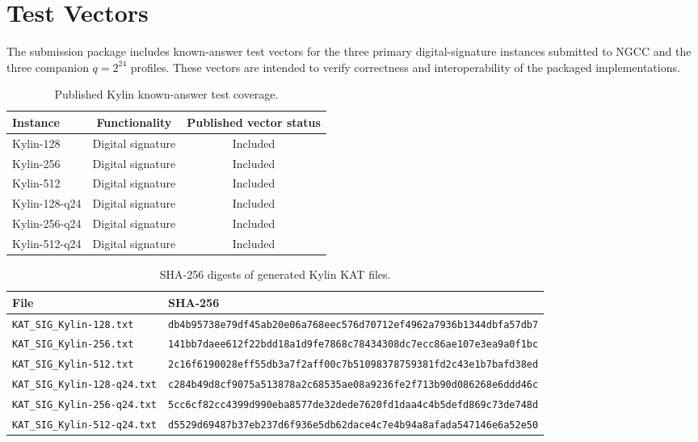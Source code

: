 \section{Test Vectors}
\label{sec:test-vectors}

The submission package includes known-answer test vectors for the three primary
digital-signature instances submitted to NGCC and the three companion
$q=2^{24}$ profiles.  These vectors are intended to verify correctness and
interoperability of the packaged implementations.

\begin{table}[htbp]
    \centering
    \caption{Published Kylin known-answer test coverage.}
    \label{tab:kat-coverage}
    \begin{tabular}{l c c}
    \toprule
    Instance & Functionality & Published vector status \\ \midrule
    Kylin-128 & Digital signature & Included \\
    Kylin-256 & Digital signature & Included \\
    Kylin-512 & Digital signature & Included \\
    Kylin-128-q24 & Digital signature & Included \\
    Kylin-256-q24 & Digital signature & Included \\
    Kylin-512-q24 & Digital signature & Included \\
    \bottomrule
    \end{tabular}
\end{table}

\begin{table}[htbp]
    \centering
    \caption{SHA-256 digests of generated Kylin KAT files.}
    \label{tab:kat-sha256}
    \scriptsize
    \begin{tabular}{l l}
    \toprule
    File & SHA-256 \\ \midrule
    \texttt{KAT\_SIG\_Kylin-128.txt} & \texttt{db4b95738e79df45ab20e06a768eec576d70712ef4962a7936b1344dbfa57db7} \\
    \texttt{KAT\_SIG\_Kylin-256.txt} & \texttt{141bb7daee612f22bdd18a1d9fe7868c78434308dc7ecc86ae107e3ea9a0f1bc} \\
    \texttt{KAT\_SIG\_Kylin-512.txt} & \texttt{2c16f6190028eff55db3a7f2aff00c7b51098378759381fd2c43e1b7bafd38ed} \\
    \texttt{KAT\_SIG\_Kylin-128-q24.txt} & \texttt{c284b49d8cf9075a513878a2c68535ae08a9236fe2f713b90d086268e6ddd46c} \\
    \texttt{KAT\_SIG\_Kylin-256-q24.txt} & \texttt{5cc6cf82cc4399d990eba8577de32dede7620fd1daa4c4b5defd869c73de748d} \\
    \texttt{KAT\_SIG\_Kylin-512-q24.txt} & \texttt{d5529d69487b37eb237d6f936e5db62dace4c7e4b94a8afada547146e6a52e50} \\
    \bottomrule
    \end{tabular}
\end{table}

